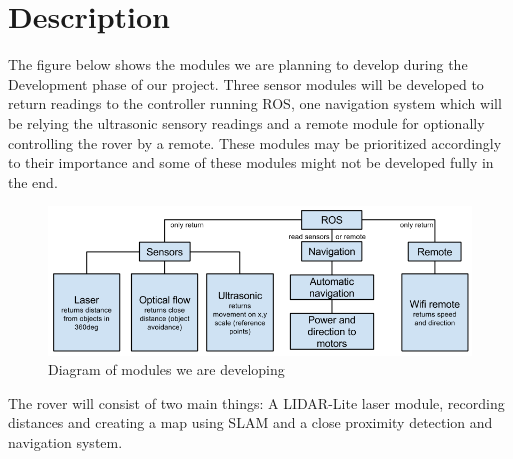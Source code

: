 \section{Description}

The figure below shows the modules we are planning to develop during the Development phase of our project. Three sensor modules will be developed to return readings to the controller running ROS, one navigation system which will be relying the ultrasonic sensory readings and a remote module for optionally controlling the rover by a remote. These modules may be prioritized accordingly to their importance and some of these modules might not be developed fully in the end.

\begin{figure}[H]
	\centering
	\includegraphics[scale=.5]{images/developmentdiagram.png}
	\caption{Diagram of modules we are developing}
	\label{fig:developmentdiagram}
\end{figure}

The rover will consist of two main things: A LIDAR-Lite laser module, recording distances and creating a map using SLAM and a close proximity detection and navigation system.